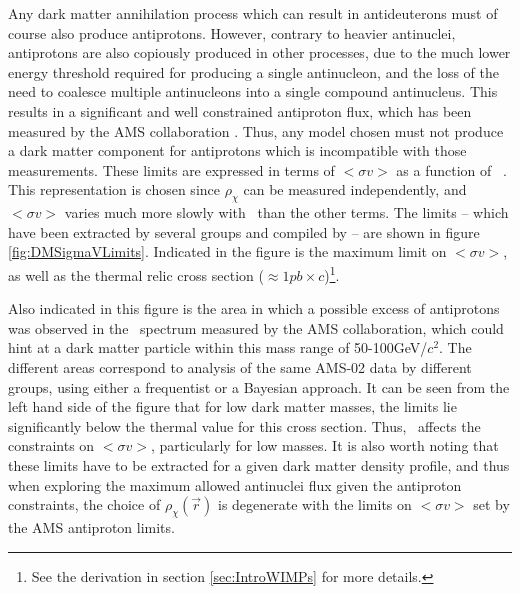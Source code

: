 Any dark matter annihilation process which can result in antideuterons must of course also produce antiprotons. However, contrary to heavier antinuclei, antiprotons are also copiously produced in other processes, due to the much lower energy threshold required for producing a single antinucleon, and the loss of the need to coalesce multiple antinucleons into a single compound antinucleus. This results in a significant and well constrained antiproton flux, which has been measured by the AMS collaboration \cite{}. Thus, any model chosen must not produce a dark matter component for antiprotons which is incompatible with those measurements. These limits are expressed in terms of $<\sigma v>$ as a function of \dmm\ . This representation is chosen since $\rho_\chi$ can be measured independently, and $<\sigma v>$ varies much more slowly with \dmm\ than the other terms. The limits -- which have been extracted by several groups \cite{} and compiled by \cite{Doetinchem_2020_review}-- are shown in figure \ref{fig:DMSigmaVLimits}. Indicated in the figure is the maximum limit on $<\sigma v>$, as well as the thermal relic cross section ($\approx 1pb \times c$)\footnote{See the derivation in section \ref{sec:IntroWIMPs} for more details.}. 

Also indicated in this figure is the area in which a possible excess of antiprotons was observed in the \pbar\ spectrum measured by the AMS collaboration, which could hint at a dark matter particle within this mass range of 50-100GeV/$c^2$. The different areas correspond to analysis of the same AMS-02 data by different groups, using either a frequentist or a Bayesian approach\cite{Doetinchem_2020_review}. It can be seen from the left hand side of the figure that for low dark matter masses, the limits lie significantly below the thermal value for this cross section. Thus, \dmm\ affects the constraints on  $<\sigma v>$, particularly for low masses. It is also worth noting that these limits have to be extracted for a given dark matter density profile, and thus when exploring the maximum allowed antinuclei flux given the antiproton constraints, the choice of $\rho_\chi(\vec{r})$ is degenerate with the limits on $<\sigma v>$ set by the AMS antiproton limits.\\

